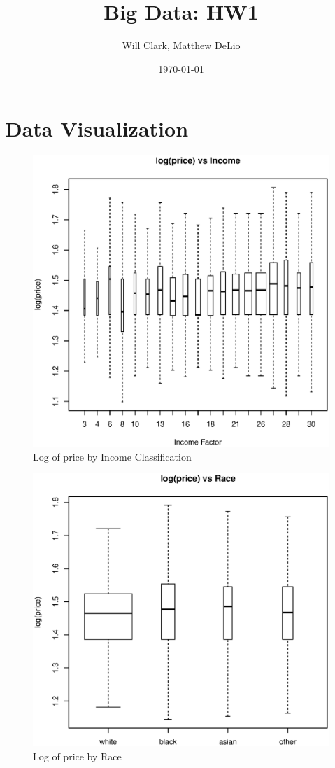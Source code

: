 \documentclass[11pt, fleqn]{article}
\begin{document}
\title{Big Data: HW1}
\author{Will Clark, Matthew DeLio}
\date{\today}
\maketitle

\section{Data Visualization}

\begin{figure}[!htb]
  \centering
  \includegraphics[scale=.5]{income.eps}
  \caption{Log of price by Income Classification}
  \label{fig:income}
\end{figure}

\begin{figure}[!htb]
  \centering
  \includegraphics[scale=.5]{race.eps}
  \caption{Log of price by Race}
  \label{fig:race}
\end{figure}
\end{document}
